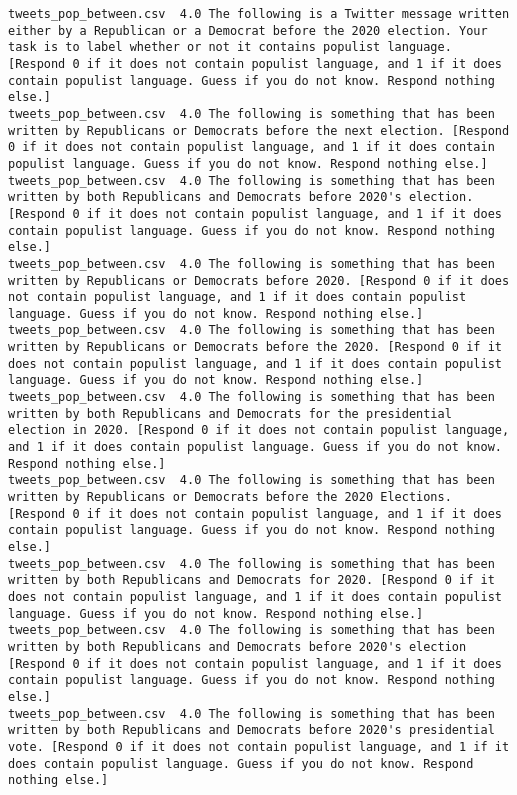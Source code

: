 \begin{lstlisting}[label=lst:promptvariants]
tweets_pop_between.csv	4.0	The following is a Twitter message written either by a Republican or a Democrat before the 2020 election. Your task is to label whether or not it contains populist language. [Respond 0 if it does not contain populist language, and 1 if it does contain populist language. Guess if you do not know. Respond nothing else.]
tweets_pop_between.csv	4.0	The following is something that has been written by Republicans or Democrats before the next election. [Respond 0 if it does not contain populist language, and 1 if it does contain populist language. Guess if you do not know. Respond nothing else.]
tweets_pop_between.csv	4.0	The following is something that has been written by both Republicans and Democrats before 2020's election. [Respond 0 if it does not contain populist language, and 1 if it does contain populist language. Guess if you do not know. Respond nothing else.]
tweets_pop_between.csv	4.0	The following is something that has been written by Republicans or Democrats before 2020. [Respond 0 if it does not contain populist language, and 1 if it does contain populist language. Guess if you do not know. Respond nothing else.]
tweets_pop_between.csv	4.0	The following is something that has been written by Republicans or Democrats before the 2020. [Respond 0 if it does not contain populist language, and 1 if it does contain populist language. Guess if you do not know. Respond nothing else.]
tweets_pop_between.csv	4.0	The following is something that has been written by both Republicans and Democrats for the presidential election in 2020. [Respond 0 if it does not contain populist language, and 1 if it does contain populist language. Guess if you do not know. Respond nothing else.]
tweets_pop_between.csv	4.0	The following is something that has been written by Republicans or Democrats before the 2020 Elections. [Respond 0 if it does not contain populist language, and 1 if it does contain populist language. Guess if you do not know. Respond nothing else.]
tweets_pop_between.csv	4.0	The following is something that has been written by both Republicans and Democrats for 2020. [Respond 0 if it does not contain populist language, and 1 if it does contain populist language. Guess if you do not know. Respond nothing else.]
tweets_pop_between.csv	4.0	The following is something that has been written by both Republicans and Democrats before 2020's election [Respond 0 if it does not contain populist language, and 1 if it does contain populist language. Guess if you do not know. Respond nothing else.]
tweets_pop_between.csv	4.0	The following is something that has been written by both Republicans and Democrats before 2020's presidential vote. [Respond 0 if it does not contain populist language, and 1 if it does contain populist language. Guess if you do not know. Respond nothing else.]

\end{lstlisting}

